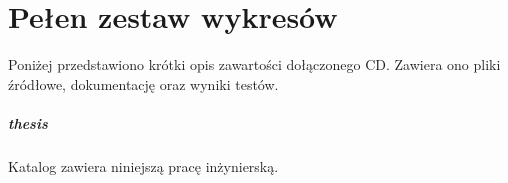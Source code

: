 \chapter{Pełen zestaw wykresów}\label{all_images}

Poniżej przedstawiono krótki opis zawartości dołączonego CD. Zawiera ono pliki źródłowe, dokumentację oraz wyniki testów.


\paragraph{thesis}
Katalog zawiera niniejszą pracę inżynierską.